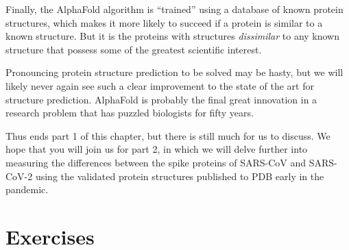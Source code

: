 Finally, the AlphaFold algorithm is ``trained'' using a database of known protein structures, which makes it more likely to succeed if a protein is similar to a known structure. But it is the proteins with structures \textit{dissimilar} to any known structure that possess some of the greatest scientific interest.

Pronouncing protein structure prediction to be solved may be hasty, but we will likely never again see such a clear improvement to the state of the art for structure prediction. AlphaFold is probably the final great innovation in a research problem that has puzzled biologists for fifty years.

Thus ends part 1 of this chapter, but there is still much for us to discuss. We hope that you will join us for part 2, in which we will delve further into measuring the differences between the spike proteins of SARS-CoV and SARS-CoV-2 using the validated protein structures published to PDB early in the pandemic.\\

\FloatBarrier
{}

\section{Exercises}

\begin{exercise}\end{exercise}
